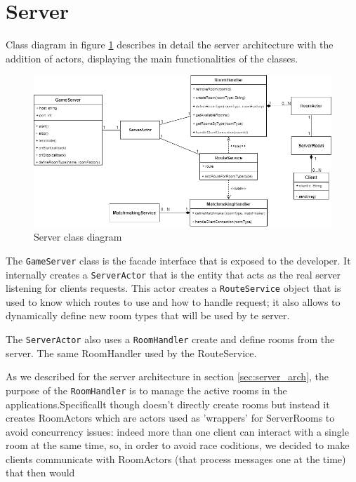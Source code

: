 \section{Server}
Class diagram in figure \ref{fig:server_class_diagram} describes in detail the server architecture with the addition of actors, displaying the main functionalities of the classes.
\begin{figure}[h]
	\hspace*{-1in}
	\includegraphics[scale=0.6]{images/4-design/server_class.png}
	\caption{Server class diagram}
	\label{fig:server_class_diagram}
\end{figure}

The \texttt{GameServer} class is the facade interface that is exposed to the developer. It internally creates a \texttt{ServerActor} that is the entity that acts as the real server listening for clients requests. This actor creates a \texttt{RouteService} object that is used to know which routes to use and how to handle request; it also allows to dynamically define new room types that will be used by te server. 

The \texttt{ServerActor} also uses a \texttt{RoomHandler} create and define rooms from the server. The same RoomHandler used by the RouteService.

As we described for the server architecture in section \ref{sec:server_arch}, the purpose of the \texttt{RoomHandler} is to manage the active rooms in the applications.Specificallt though doesn't directly create rooms but instead it creates RoomActors which are actors used as 'wrappers' for ServerRooms to avoid concurrency issues: indeed more than one client can interact with a single room at the same time, so, in order to avoid race coditions, we decided to make clients communicate with RoomActors (that process messages one at the time) that then would 

